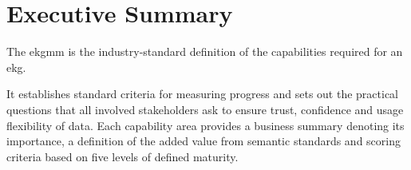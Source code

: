 \chapter{Executive Summary}\label{ch:ekg-mm-executive-summary}

The \gls{ekgmm} is the industry-standard definition of the capabilities
required for an \gls{ekg}.

It establishes standard criteria for measuring progress and sets out the practical questions that all involved
stakeholders ask to ensure trust, confidence and usage flexibility of data.
Each capability area provides a business summary denoting its importance, a definition of the added value from
semantic standards and scoring criteria based on five levels of defined maturity.

